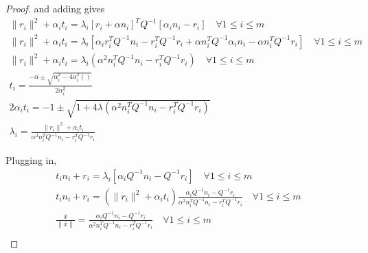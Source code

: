 \begin{proof}
and adding gives
\begin{align*}
\|r_i\|^2  + \alpha_i t_i = \lambda_i\left[r_i + \alpha n_i\right]^TQ^{-1}\left[\alpha_i n_i - r_i\right] \quad \forall 1\le i\le m \\
\|r_i\|^2  + \alpha_i t_i = \lambda_i\left[ \alpha_ir_i^T Q^{-1} n_i - r_i^T Q^{-1}r_i  + \alpha n_i^TQ^{-1}\alpha_i n_i - \alpha n_i^TQ^{-1}r_i   \right] \quad \forall 1\le i\le m \\
\|r_i\|^2  + \alpha_i t_i = \lambda_i\left(\alpha^2 n_i^TQ^{-1} n_i - r_i^T Q^{-1}r_i  \right) \quad \forall 1\le i\le m \\
t_i = \frac{-\alpha \pm \sqrt{\alpha_i^2 - 4\alpha_i^2()}}{2\alpha_i^2} \\
2\alpha_it_i = -1 \pm \sqrt{1 + 4\lambda(\alpha^2 n_i^TQ^{-1} n_i - r_i^T Q^{-1}r_i)} \\
\lambda_i = \frac{\|r_i\|^2  + \alpha_i t_i}{\alpha^2 n_i^TQ^{-1} n_i - r_i^T Q^{-1}r_i}
\end{align*}

Plugging in,
\begin{align*}
t_in_i + r_i = \lambda_i \left[\alpha_i Q^{-1} n_i - Q^{-1}r_i \right] \quad \forall 1\le i\le m \\
t_in_i + r_i = (\|r_i\|^2  + \alpha_i t_i)\frac{\alpha_i Q^{-1} n_i - Q^{-1}r_i}{\alpha^2 n_i^TQ^{-1} n_i - r_i^T Q^{-1}r_i} \quad \forall 1\le i\le m \\
\frac{\bar x}{\|\bar x\|} = \frac{\alpha_i Q^{-1} n_i - Q^{-1}r_i}{\alpha^2 n_i^TQ^{-1} n_i - r_i^T Q^{-1}r_i} \quad \forall 1\le i\le m \\
\end{align*}



\end{proof}
